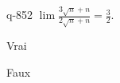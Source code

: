 \begin{truefalse}{q-852}
$\lim \frac{3\sqrt n +n}{2 \sqrt n + n} = \frac{3}{2}$.
\item Vrai
\item* Faux
\end{truefalse}


